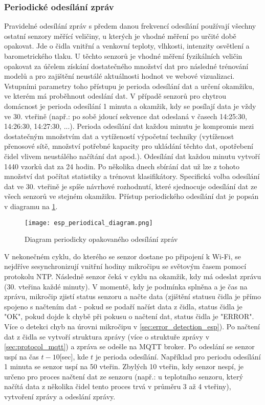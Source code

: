  \subsubsection*{Periodické odesílání zpráv}
Pravidelné odesílání zpráv s předem danou frekvencí odesílání používají všechny ostatní senzory měřící veličiny, u kterých je vhodné měření po určité době opakovat. Jde o čidla vnitřní a venkovní teploty, vlhkosti, intenzity osvětlení a barometrického tlaku. U těchto senzorů je vhodné měření fyzikálních veličin opakovat za účelem získání dostatečného množství dat pro následné trénování modelů a pro zajištění neustálé aktuálnosti hodnot ve webové vizualizaci. Vstupními parametry toho přístupu je perioda odesílání dat a určení okamžiku, ve kterém má proběhnout odeslání dat. V případě senzorů pro chytrou domácnost je perioda odesílání 1 minuta a okamžik, kdy se posílají data je vždy ve 30. vteřině (např.: po sobě jdoucí sekvence dat odeslaná v časech 14:25:30, 14:26:30, 14:27:30, ...). Perioda odesílání dat každou minutu je kompromis mezi dostatečným množstvím dat a vytížeností výpočetní techniky (vytíženost přenosové sítě, množství potřebné kapacity pro ukládání těchto dat, opotřebení čidel vlivem neustálého načítání dat apod.). Odesílání dat každou minutu vytvoří 1440 vzorků dat za 24 hodin. Po několika dnech sbírání dat už lze z tohoto množství dat počítat statistiky a trénovat klasifikátory. Specifická volba odesílání dat ve 30. vteřině je spíše návrhové rozhodnutí, které sjednocuje odesílání dat ze všech senzorů ve stejném okamžiku. Přístup periodického odesílání dat je popsán v diagramu na \cref{fig:esp_periodical_diagram}.

\begin{figure}[H]
  \centering
  \texttt{[image: esp\_periodical\_diagram.png]}
  \caption{Diagram periodicky opakovaného odesílání zpráv}
  \label{fig:esp_periodical_diagram}
\end{figure}

V nekonečném cyklu, do kterého se senzor dostane po připojení k Wi-Fi, se nejdříve sesynchronizují vnitřní hodiny mikročipu se světovým časem pomocí protokolu NTP. Následně senzor čeká v cyklu na okamžik, kdy má odeslat zprávu (30. vteřina každé minuty). V momentě, kdy je podmínka splněna a je čas na zprávu, mikročip zjistí status senzoru a načte data (zjištění statusu čidla je přímo spojeno s načtením dat - pokud se podaří načíst data z čidla, status čidla je "OK", pokud dojde k chybě při pokusu o načtení dat, status čidla je "ERROR". Více o detekci chyb na úrovni mikročipu v \cref{sec:error_detection_esp}). Po načtení dat z čidla se vytvoří struktura zprávy (více o struktuře zprávy v \cref{sec:protocol_mqtt}) a zpráva se odešle na MQTT broker. Po odeslání se senzor uspí na čas $t-10$[sec], kde $t$ je perioda odesílání. Například pro periodu odesílání 1 minuta se senzor uspí na 50 vteřin. Zbylých 10 vteřin, kdy senzor nespí, je určeno pro proces načtení dat ze senzoru (např.: u teplotního senzoru, který načítá data z několika čidel tento proces trvá v průměru 3 až 4 vteřiny), vytvoření zprávy a odeslání zprávy.

